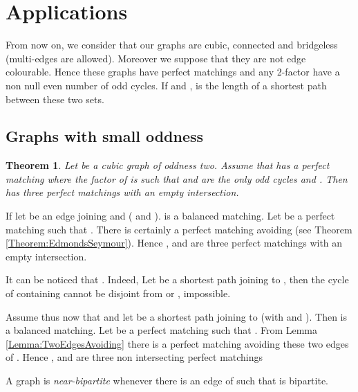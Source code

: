 \documentclass{elsart}
\theoremstyle{plain} \theoremheaderfont{\scshape}
\newtheorem{Thm}{\bf Theorem}
\newenvironment{Prf}{{\bf \noindent Proof } }{\hfill\\}
\begin{document}
\section{Applications}

From now on, we consider that our graphs are cubic, connected and
bridgeless (multi-edges are allowed). Moreover we suppose that they
are not edge colourable. Hence these graphs have perfect
matchings and any 2-factor have a non null even number of odd
cycles. If  and ,  is the
length of a shortest path between these two sets.

\subsection{Graphs with small oddness}
\begin{Thm} \label{Theorem:Distance3Oddness2}Let  be a cubic graph of oddness two. Assume that 
has a perfect matching  where the factor  of  is such that  and  are
the only odd cycles and . Then  has three
perfect matchings with an empty intersection.
\end{Thm}
\begin{Prf}

If  let  be an edge joining  and  ( and ).  is a balanced matching.
Let  be a perfect matching such that . There is
certainly a perfect matching  avoiding  (see Theorem
\ref{Theorem:EdmondsSeymour}). Hence ,  and  are three
perfect matchings with an empty intersection.

It can be noticed that . Indeed, Let
 be a shortest path joining  to , then the cycle of  containing  cannot be
disjoint from  or , impossible.

Assume thus now that  and let  be a
shortest path joining  to  (with  and ). Then  is a balanced matching.
Let  be a perfect matching such that . From
Lemma \ref{Lemma:TwoEdgesAvoiding} there is a perfect matching 
avoiding these two edges of . Hence ,  and  are
three non intersecting perfect matchings
\end{Prf}

A graph  is {\em near-bipartite} whenever there is an edge  of
 such that  is bipartite.
\end{document}
